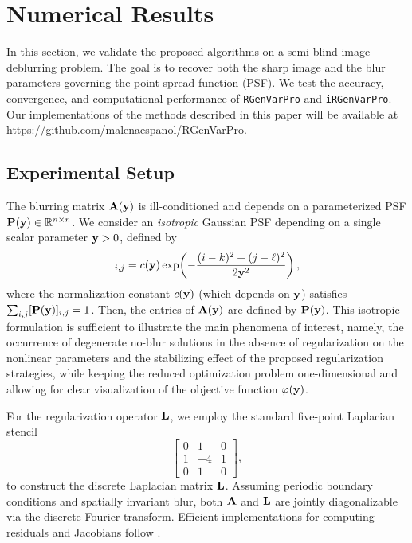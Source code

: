 \documentclass[onefignum,onetabnum]{siamart171218}
\newcommand{\bA}{{\bf A}}
\newcommand{\bL}{{\bf L}}
\newcommand{\bP}{{\bf P}}
\newcommand{\by}{{\bf y}}
\begin{document}
\section{Numerical Results}\label{section:NumericalExamples}

In this section, we validate the proposed algorithms on a semi-blind image deblurring problem. The goal is to recover both the sharp image and the blur parameters governing the point spread function (PSF). We test the accuracy, convergence, and computational performance of \texttt{RGenVarPro} and \texttt{iRGenVarPro}.  Our implementations of the methods described in this paper will be available at \url{https://github.com/malenaespanol/RGenVarPro}.

\subsection{Experimental Setup}

The blurring matrix $\bA(\by)$ is ill-conditioned and depends on a parameterized PSF $\bP(\by)\in\mathbb{R}^{n\times n}$. 
We consider an \emph{isotropic} Gaussian PSF depending on a single scalar parameter $\by>0$, defined by
\begin{equation*}
[\bP(\by)]_{i,j} = c(\by)\exp\!\left(-\frac{(i-k)^2 + (j-\ell)^2}{2\by^2}\right),
\end{equation*}
where the normalization constant $c(\by)$ (which depends on $\by$) satisfies $\sum_{i,j} [\bP(\by)]_{i,j} = 1$. 
Then, the entries of $\bA(\by)$ are defined by $\bP(\by)$. This isotropic formulation is sufficient to illustrate the main phenomena of interest, namely, the occurrence of degenerate no-blur solutions in the absence of regularization on the nonlinear parameters and the stabilizing effect of the proposed regularization strategies, while keeping the reduced optimization problem one-dimensional and allowing for clear visualization of the objective function $\varphi(\by)$.

For the regularization operator $\bL$, we employ the standard five-point Laplacian stencil
\begin{equation*}
\begin{bmatrix} 
0 & 1 & 0 \\ 
1 & -4 & 1\\ 
0 & 1 & 0
\end{bmatrix},
\end{equation*}
to construct the discrete Laplacian matrix $\bL$. Assuming periodic boundary conditions and spatially invariant blur, both $\bA$ and $\bL$ are jointly diagonalizable via the discrete Fourier transform. Efficient implementations for computing residuals and Jacobians follow \cite{Espanol_2023}.
\end{document}
